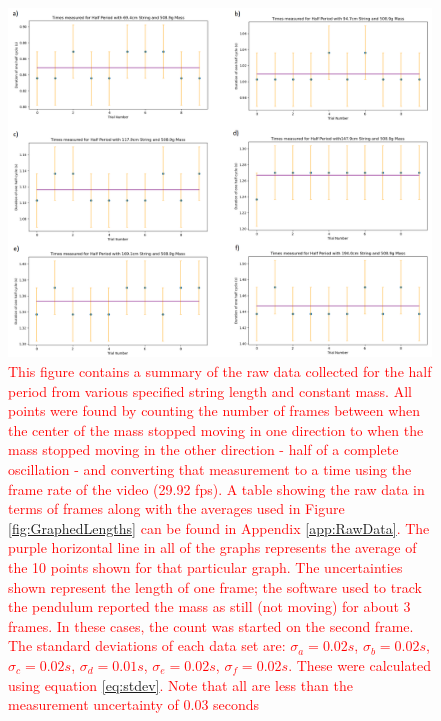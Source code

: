 \documentclass[11pt]{article}
\begin{document}
        \begin{figure}[H]
            \centering\includegraphics[width = \textwidth]{AllRawLengthTimes.PNG}
            \caption{\textcolor{red}{This figure contains a summary of the raw data collected for the half period from various specified string length and constant mass. All points were found by counting the number of frames between when the center of the mass stopped moving in one direction to when the mass stopped moving in the other direction - half of a complete oscillation - and converting that measurement to a time using the frame rate of the video (29.92 fps). A table showing the raw data in terms of frames along with the averages used in Figure \ref{fig:GraphedLengths} can be found in Appendix \ref{app:RawData}. The purple horizontal line in all of the graphs represents the average of the 10 points shown for that particular graph. The uncertainties shown represent the length of one frame; the software used to track the pendulum reported the mass as still (not moving) for about 3 frames. In these cases, the count was started on the second frame. The standard deviations of each data set are: $\sigma_a = 0.02s$, $\sigma_b = 0.02s$, $\sigma_c = 0.02s$, $\sigma_d = 0.01s$, $\sigma_e = 0.02s$, $\sigma_f = 0.02s$. These were calculated using equation \ref{eq:stdev}. Note that all are less than the measurement uncertainty of 0.03 seconds}}
            \label{fig:RawLengthData}
        \end{figure}
\end{document}
